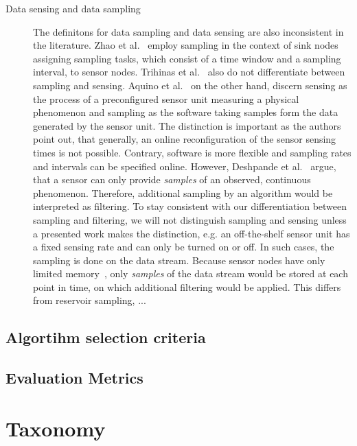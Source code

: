 \begin{description}
    \item[Data sensing and data sampling] 
        The definitons for data sampling and data sensing are also inconsistent
        in the literature. Zhao et al.~\cite{zhao2016cats} employ sampling in
        the context of sink nodes assigning sampling tasks, which consist of a
        time window and a sampling interval, to sensor nodes. Trihinas et
        al.~\cite{trihinas2015adam} also do not differentiate between sampling
        and sensing.  Aquino et al.~\cite{aquino2014musa} on the other hand,
        discern sensing as the process of a preconfigured sensor unit measuring
        a physical phenomenon and sampling as the software taking samples form
        the data generated by the sensor unit. The distinction is important as
        the authors point out, that generally, an online reconfiguration of the
        sensor sensing times is not possible. Contrary, software is more
        flexible and sampling rates and intervals can be specified online.
        However, Deshpande et al.~\cite{deshpande2004model} argue, that a
        sensor can only provide \textit{samples} of an observed, continuous
        phenomenon. Therefore, additional sampling by an algorithm would be
        interpreted as filtering. To stay consistent with our differentiation
        between sampling and filtering, we will not distinguish sampling and
        sensing unless a presented work makes the distinction, e.g. an
        off-the-shelf sensor unit has a fixed sensing rate and can only be
        turned on or off. In such cases, the sampling is done on the data
        stream. Because sensor nodes have only limited
        memory~\cite{akyildiz2002wireless}, only \textit{samples} of the data
        stream would be stored at each point in time, on which additional
        filtering would be applied. This differs from reservoir sampling, ...
\end{description}
\par

\subsection{Algortihm selection criteria}
\label{sec:Algortihm selection criteria}


\subsection{Evaluation Metrics}
\label{sec:Evaluation Metrics}

\section{Taxonomy}
\label{sec:Taxonomy}

